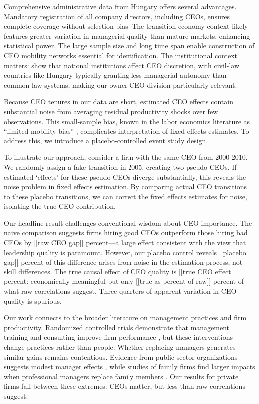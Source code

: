 \documentclass[11pt,a4paper]{article}
\begin{document}
Comprehensive administrative data from Hungary offers several advantages. Mandatory registration of all company directors, including CEOs, ensures complete coverage without selection bias. The transition economy context likely features greater variation in managerial quality than mature markets, enhancing statistical power. The large sample size and long time span enable construction of CEO mobility networks essential for identification. The institutional context matters: \citet{crossland2011differences} show that national institutions affect CEO discretion, with civil-law countries like Hungary typically granting less managerial autonomy than common-law systems, making our owner-CEO division particularly relevant.

Because CEO tenures in our data are short, estimated CEO effects contain substantial noise from averaging residual productivity shocks over few observations. This small-sample bias, known in the labor economics literature as ``limited mobility bias'' \citep{andrews2008high}, complicates interpretation of fixed effects estimates. To address this, we introduce a placebo-controlled event study design.

To illustrate our approach, consider a firm with the same CEO from 2000-2010. We randomly assign a fake transition in 2005, creating two pseudo-CEOs. If estimated `effects' for these pseudo-CEOs diverge substantially, this reveals the noise problem in fixed effects estimation. By comparing actual CEO transitions to these placebo transitions, we can correct the fixed effects estimates for noise, isolating the true CEO contribution.

Our headline result challenges conventional wisdom about CEO importance. The naive comparison suggests firms hiring good CEOs outperform those hiring bad CEOs by [[raw CEO gap]] percent—a large effect consistent with the view that leadership quality is paramount. However, our placebo control reveals [[placebo gap]] percent of this difference arises from noise in the estimation process, not skill differences. The true causal effect of CEO quality is [[true CEO effect]] percent: economically meaningful but only [[true as percent of raw]] percent of what raw correlations suggest. Three-quarters of apparent variation in CEO quality is spurious.

Our work connects to the broader literature on management practices and firm productivity. Randomized controlled trials demonstrate that management training and consulting improve firm performance \citep{bloom2013does}, but these interventions change practices rather than people. Whether replacing managers generates similar gains remains contentious. Evidence from public sector organizations suggests modest manager effects \citep{fenizia2022managers, janke2024role}, while studies of family firms find larger impacts when professional managers replace family members \citep{bennedsen2007inside}. Our results for private firms fall between these extremes: CEOs matter, but less than raw correlations suggest.
\end{document}
